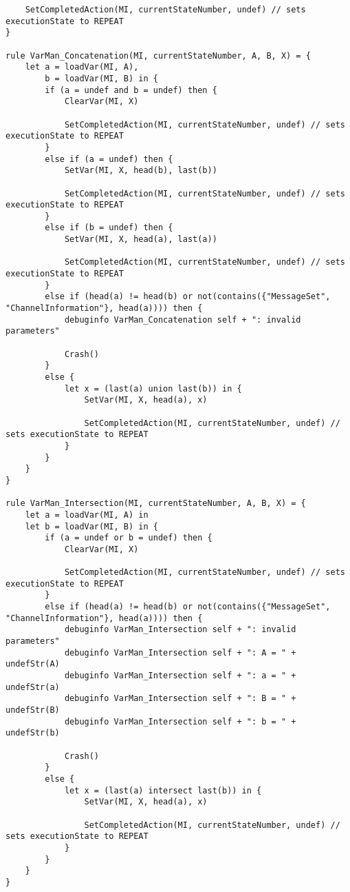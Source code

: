 \begin{listing}[H]
\begin{verbatim}
    SetCompletedAction(MI, currentStateNumber, undef) // sets executionState to REPEAT
}

rule VarMan_Concatenation(MI, currentStateNumber, A, B, X) = {
    let a = loadVar(MI, A),
        b = loadVar(MI, B) in {
        if (a = undef and b = undef) then {
            ClearVar(MI, X)

            SetCompletedAction(MI, currentStateNumber, undef) // sets executionState to REPEAT
        }
        else if (a = undef) then {
            SetVar(MI, X, head(b), last(b))

            SetCompletedAction(MI, currentStateNumber, undef) // sets executionState to REPEAT
        }
        else if (b = undef) then {
            SetVar(MI, X, head(a), last(a))

            SetCompletedAction(MI, currentStateNumber, undef) // sets executionState to REPEAT
        }
        else if (head(a) != head(b) or not(contains({"MessageSet", "ChannelInformation"}, head(a)))) then {
            debuginfo VarMan_Concatenation self + ": invalid parameters"

            Crash()
        }
        else {
            let x = (last(a) union last(b)) in {
                SetVar(MI, X, head(a), x)

                SetCompletedAction(MI, currentStateNumber, undef) // sets executionState to REPEAT
            }
        }
    }
}

rule VarMan_Intersection(MI, currentStateNumber, A, B, X) = {
    let a = loadVar(MI, A) in
    let b = loadVar(MI, B) in {
        if (a = undef or b = undef) then {
            ClearVar(MI, X)

            SetCompletedAction(MI, currentStateNumber, undef) // sets executionState to REPEAT
        }
        else if (head(a) != head(b) or not(contains({"MessageSet", "ChannelInformation"}, head(a)))) then {
            debuginfo VarMan_Intersection self + ": invalid parameters"
            debuginfo VarMan_Intersection self + ": A = " + undefStr(A)
            debuginfo VarMan_Intersection self + ": a = " + undefStr(a)
            debuginfo VarMan_Intersection self + ": B = " + undefStr(B)
            debuginfo VarMan_Intersection self + ": b = " + undefStr(b)

            Crash()
        }
        else {
            let x = (last(a) intersect last(b)) in {
                SetVar(MI, X, head(a), x)

                SetCompletedAction(MI, currentStateNumber, undef) // sets executionState to REPEAT
            }
        }
    }
}


\end{verbatim}
\end{listing}

